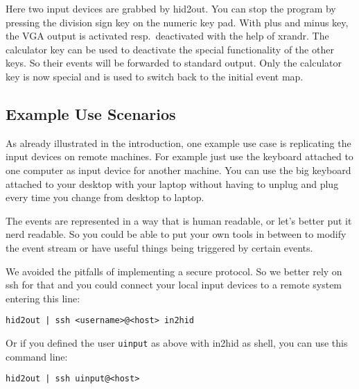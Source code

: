 Here two input devices are grabbed by hid2out. 
You can stop the program by pressing the division sign key 
on the numeric key pad.
With plus and minus key, the VGA output is activated resp.~deactivated
with the help of xrandr.
The calculator key can be used to deactivate the special functionality
of the other keys. So their events will be forwarded to standard output.
Only the calculator key is now special and is used to switch back
to the initial event map.

\subsection{Example Use Scenarios}
As already illustrated in the introduction, one example use case is
replicating the input devices on remote machines. For example just use
the keyboard attached to one computer as input device for another machine.
You
can use the big keyboard attached to your desktop with your laptop
without having to unplug and plug every time you change from desktop to
laptop.

The events are represented in a way that is human readable, or let's
better put it nerd readable. So you could be able to put your own tools
in between to modify the event stream or have useful things being
triggered by certain events.

We  avoided the pitfalls of implementing a secure protocol.
So we better rely on ssh for that and you could connect your local
input devices to a remote system entering this line:
\begin{verbatim}
hid2out | ssh <username>@<host> in2hid
\end{verbatim}

Or if you defined the user \texttt{uinput} as above with 
in2hid as shell, you can use this command line:
\begin{verbatim}
hid2out | ssh uinput@<host>
\end{verbatim}



